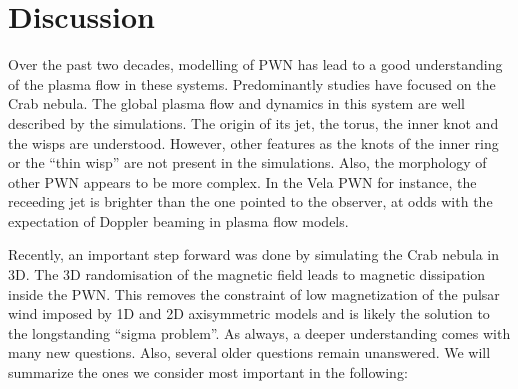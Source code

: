 \section{Discussion}
\label{sec:discussion}

Over the past two decades, modelling of PWN has lead to a good understanding of the plasma flow in these systems. Predominantly studies have focused on the Crab nebula.  The global plasma flow and dynamics in this system are well described by the simulations. The origin of its jet, the torus, the inner knot and the wisps are understood. However, other features as the knots of the inner ring or the ``thin wisp'' \cite{Hester_1995} are not present in the simulations. Also, the morphology of other PWN appears to be more complex. In the Vela PWN for instance, the receeding jet is brighter than the one pointed to the observer, at odds with the expectation of Doppler beaming in plasma flow models.

Recently, an important step forward was done by simulating the Crab nebula in 3D. The 3D randomisation of the magnetic field leads to magnetic dissipation inside the PWN. This removes the constraint of low magnetization of the pulsar wind imposed by 1D and 2D axisymmetric models and is likely the solution to the longstanding ``sigma problem''. As always, a deeper understanding comes with many new questions. Also, several older questions remain unanswered. We will summarize the ones we consider most important in the following: 

